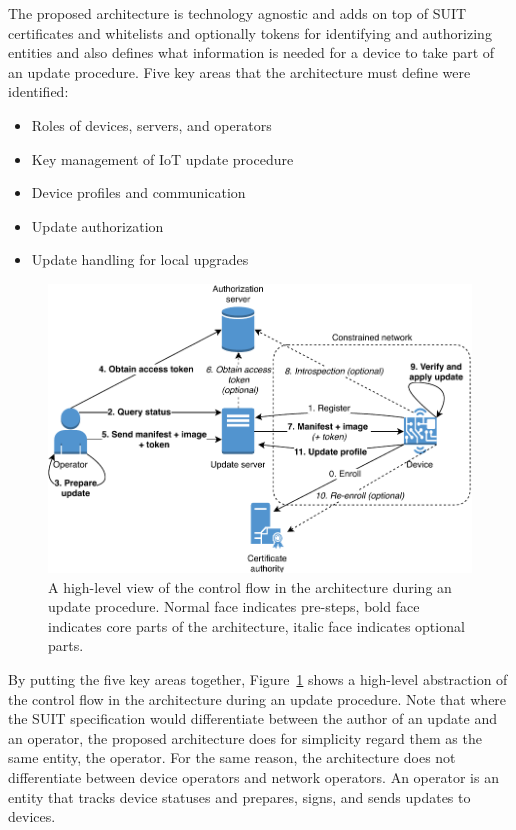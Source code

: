\documentclass[0-thesis.tex]{subfiles}
\begin{document}
 

The proposed architecture is technology agnostic and adds on top of SUIT certificates and
whitelists and optionally tokens for identifying and authorizing entities and also defines
what information is needed for a device to take part of an update procedure. Five key
areas that the architecture must define were identified:

\begin{itemize}
    \item Roles of devices, servers, and operators
    \item Key management of IoT update procedure
    \item Device profiles and communication
    \item Update authorization
    \item Update handling for local upgrades
\end{itemize}

\begin{figure}[t]
    \caption{A high-level view of the control flow in the architecture during an update
    procedure. Normal face indicates pre-steps, bold face indicates core parts of the architecture, italic face indicates optional parts.}
    \label{fig:communication-workflow}
    \includegraphics{images/update-flow.pdf}
\end{figure}

By putting the five key areas together, Figure~\ref{fig:communication-workflow} shows a
high-level abstraction of the control flow in the architecture during an update procedure.
Note that where the SUIT specification would differentiate between the author of an update
and an operator, the proposed architecture does for simplicity regard them as the same
entity, the operator. For the same reason, the architecture does not differentiate between
device operators and network operators. An operator is an entity that tracks device
statuses and prepares, signs, and sends updates to devices.
\end{document}

